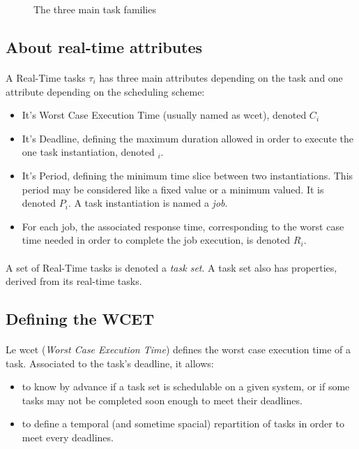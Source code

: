 \begin{figure}[h]

\caption{The three main task families}
\label{fig:rt_hard_soft}
\end{figure}

\subsection{About real-time attributes}
\label{sec:primarydef}

\paragraph{}
A Real-Time tasks $\tau_{i}$ has three main attributes depending on the task and one attribute
depending on the scheduling scheme:
\begin{itemize}
\item It's Worst Case Execution Time (usually named as \gls{wcet}), denoted $C_{i}$
\item It's Deadline, defining the maximum duration allowed in order to execute the one task
instantiation, denoted $_{i}$.
\item It's Period, defining the minimum time slice between two instantiations. This period may be
considered like a fixed value or a minimum valued. It is denoted $P_{i}$. A task instantiation is
named a {\it job}.
\item For each job, the associated response time, corresponding to the worst case time needed in
order to complete the job execution, is denoted $R_{i}$.
\end{itemize}

\paragraph{}
A set of Real-Time tasks is denoted a {\it task set}. A task set also has properties, derived from
its real-time tasks.

\subsection{Defining the WCET}

\paragraph{}
Le \gls{wcet} ({\it Worst Case Execution Time}) defines the worst case execution time of a task.
Associated to the task's deadline, it allows:
\begin{itemize}
\item to know by advance if a task set is schedulable on a given system, or if some tasks may not
be completed soon enough to meet their deadlines.
\item to define a temporal (and sometime spacial) repartition of tasks in order to meet every
deadlines.
\end{itemize}

